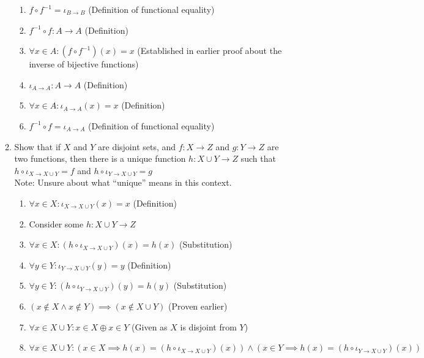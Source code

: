 \documentclass{article}
\begin{document}
\begin{enumerate}
\begin{enumerate}
\begin{enumerate}
                        \item $f \circ f^{-1} = {\iota}_{B \rightarrow B}$ (Definition of functional equality)
                        \item $f^{-1} \circ f : A \rightarrow A$ (Definition)
                        \item $\forall x \in A: (f \circ f^{-1})(x) = x$ (Established in earlier proof about the inverse of bijective functions)
                        \item ${\iota}_{A \rightarrow A} : A \rightarrow A$ (Definition)
                        \item $\forall x \in A: {\iota}_{A \rightarrow A}(x) = x$ (Definition)
                        \item $f^{-1} \circ f = {\iota}_{A \rightarrow A}$ (Definition of functional equality)
                    \end{enumerate}
                \item Show that if $X$ and $Y$ are disjoint sets, and $f : X
                    \rightarrow Z$ and $g : Y \rightarrow Z$ are two functions,
                    then there is a unique function $h : X \cup Y \rightarrow
                    Z$ such that $h \circ {\iota}_{X \rightarrow X \cup Y} = f$
                    and $h \circ {\iota}_{Y \rightarrow X \cup Y} = g$ \\
                    Note: Unsure about what ``unique'' means in this context.
                    \begin{enumerate}
                        \item $\forall x \in X: {\iota}_{X \rightarrow X \cup Y}(x) = x$ (Definition)
                        \item Consider some $h: X \cup Y \rightarrow Z$
                        \item $\forall x \in X: (h \circ {\iota}_{X \rightarrow X \cup Y})(x) = h(x)$ (Substitution)
                        \item $\forall y \in Y: {\iota}_{Y \rightarrow X \cup Y}(y) = y$ (Definition)
                        \item $\forall y \in Y: (h \circ {\iota}_{Y \rightarrow X \cup Y})(y) = h(y)$ (Substitution)
                        \item $(x \notin X \land x \notin Y) \implies (x \notin X \cup Y)$ (Proven earlier)
                        \item $\forall x \in X \cup Y: x \in X \oplus x \in Y$ (Given as $X$ is disjoint from $Y$)
                        \item $\forall x \in X \cup Y: (x \in X \implies h(x) = (h \circ {\iota}_{X \rightarrow X \cup Y})(x)) \land (x \in Y \implies h(x) = (h \circ {\iota}_{Y \rightarrow X \cup Y})(x))$

\end{enumerate}
\end{enumerate}
\end{enumerate}
\end{document}
